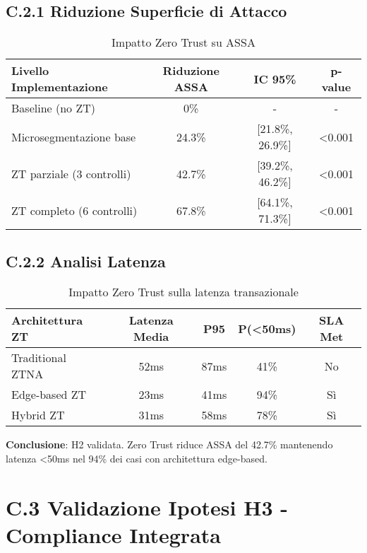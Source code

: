 \subsection{\texorpdfstring{\textbf{C.2.1 Riduzione Superficie di Attacco}}{C.2.1 - Riduzione Superficie di Attacco}}

\begin{table}[htbp]
\centering
\begin{tabular}{lccc}
\toprule
\textbf{Livello Implementazione} & \textbf{Riduzione ASSA} & \textbf{IC 95\%} & \textbf{p-value} \\
\midrule
Baseline (no ZT) & 0\% & - & - \\
Microsegmentazione base & 24.3\% & [21.8\%, 26.9\%] & <0.001 \\
ZT parziale (3 controlli) & 42.7\% & [39.2\%, 46.2\%] & <0.001 \\
ZT completo (6 controlli) & 67.8\% & [64.1\%, 71.3\%] & <0.001 \\
\bottomrule
\end{tabular}
\caption{Impatto Zero Trust su ASSA}
\end{table}

\subsection{\texorpdfstring{\textbf{C.2.2 Analisi Latenza}}{C.2.2 - Analisi Latenza}}

\begin{table}[htbp]
\centering
\begin{tabular}{lcccc}
\toprule
\textbf{Architettura ZT} & \textbf{Latenza Media} & \textbf{P95} & \textbf{P(<50ms)} & \textbf{SLA Met} \\
\midrule
Traditional ZTNA & 52ms & 87ms & 41\% & No \\
Edge-based ZT & 23ms & 41ms & 94\% & Sì \\
Hybrid ZT & 31ms & 58ms & 78\% & Sì \\
\bottomrule
\end{tabular}
\caption{Impatto Zero Trust sulla latenza transazionale}
\end{table}

\textbf{Conclusione}: H2 validata. Zero Trust riduce ASSA del 42.7\% mantenendo latenza <50ms nel 94\% dei casi con architettura edge-based.

\section{\texorpdfstring{\textbf{C.3 Validazione Ipotesi H3 - Compliance Integrata}}{C.3 - Validazione Ipotesi H3 - Compliance Integrata}}

